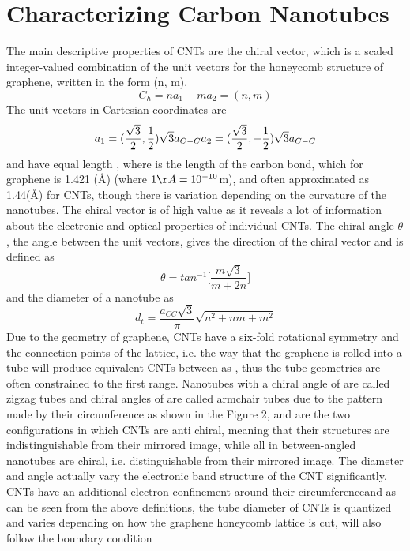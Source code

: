 \section{Characterizing Carbon Nanotubes}
The main descriptive properties of CNTs are the chiral vector, which is a scaled integer-valued combination of the unit vectors for the honeycomb structure of graphene, written in the form (n, m).
\begin{equation}
	C_h = na_1 + ma_2 = (n, m)
\end{equation}
The unit vectors in Cartesian coordinates are
\begin{equation}
	a_1 = (\frac{\sqrt3}{2}, \frac{1}{2})\sqrt{3}a_{C-C}\\
	a_2 = (\frac{\sqrt3}{2}, -\frac{1}{2})\sqrt{3}a_{C-C}
\end{equation}
and have equal length ,  where  is the length of the carbon bond, which for graphene is 1.421 (\AA) (where $1\AA = 10^{-10}$m), and often approximated as 1.44(\AA) for CNTs, though there is variation depending on the curvature of the nanotubes\cite{saito}.
The chiral vector is of high value as it reveals a lot of information about the electronic and optical properties of individual CNTs. The chiral angle $\theta$, the angle between the unit vectors, gives the direction of the chiral vector and is defined as
\begin{equation}
	\theta = tan^{-1}\Bigg[\frac{m\sqrt{3}}{m + 2n}\Bigg]
\end{equation}
and the diameter of a nanotube as
\begin{equation}
	d_t = \frac{a_{CC}\sqrt{3}}{\pi} \sqrt{n^2 + nm + m^2}
\end{equation}
Due to the geometry of graphene, CNTs have a six-fold rotational symmetry and the connection points of the lattice, i.e. the way that the graphene is rolled into a tube will produce equivalent CNTs between  as , thus the tube geometries are often constrained to the first range. Nanotubes with a chiral angle of  are called zigzag tubes and chiral angles of  are called armchair tubes due to the pattern made by their circumference as shown in the Figure 2, and are the two configurations in which CNTs are anti chiral, meaning that their structures are indistinguishable from their mirrored image, while all in between-angled nanotubes are chiral, i.e. distinguishable from their mirrored image. The diameter and angle actually vary the electronic band structure of the CNT significantly. CNTs have an additional electron confinement around their circumference\cite{yamashita}and as can be seen from the above definitions, the tube diameter of CNTs is quantized and varies depending on how the graphene honeycomb lattice is cut, will also follow the boundary condition
